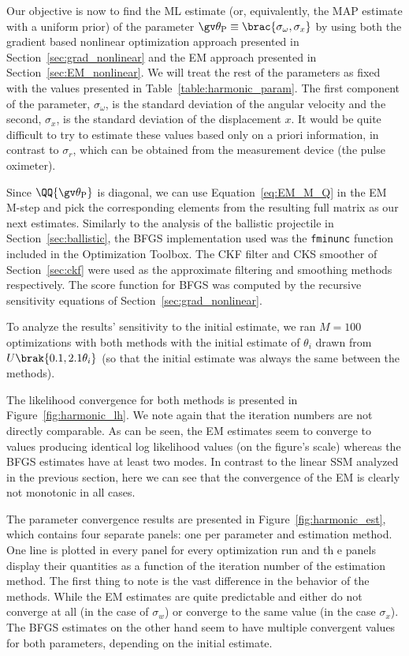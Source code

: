 Our objective is now to find the ML estimate (or, equivalently, the MAP estimate with a uniform prior)
of the parameter $\Th_{\textrm{P}}\equiv \brac{\sigma_\omega,\sigma_x}$ by using both the
gradient based nonlinear optimization approach presented in Section~\ref{sec:grad_nonlinear} and the EM
approach presented in Section~\ref{sec:EM_nonlinear}. We will treat
the rest of the parameters as fixed with the values 
presented in Table~\ref{table:harmonic_param}.
The first component of the parameter, $\sigma_\omega$, is the standard deviation
of the angular velocity and the second, $\sigma_x$, is the standard deviation
of the displacement $x$. It would be quite difficult to try to estimate
these values based only on a priori information, in contrast to $\sigma_r$,
which can be obtained from the measurement device (the pulse oximeter).

Since $\QQ{\Th_{\textrm{P}}}$ is diagonal, we can use Equation~\eqref{eq:EM_M_Q}
in the EM M-step and pick the corresponding elements from the resulting full matrix
as our next estimates. Similarly to the analysis of the ballistic projectile in Section~\ref{sec:ballistic}, 
the BFGS implementation used was the \texttt{fminunc} function included in the 
\matlab{} Optimization Toolbox. The CKF filter and CKS smoother of Section~\ref{sec:ckf} were used
as the approximate filtering and smoothing methods respectively. The score function
for BFGS was computed by the recursive sensitivity equations of Section~\ref{sec:grad_nonlinear}.  

To analyze the results' sensitivity to the initial estimate, we ran $M=100$ optimizations
with both methods with the initial estimate of $\theta_i$ drawn from 
$U\brak{0.1,2.1\theta_i}$ (so that the initial estimate was always the same between the methods). 


The likelihood convergence for
both methods is presented in Figure~\ref{fig:harmonic_lh}.
We note again that the iteration numbers are
not directly comparable. As can be seen, the EM estimates seem to
converge to values producing identical log likelihood values (on the figure's scale) whereas
the BFGS estimates have at least two modes. In contrast to the linear SSM
analyzed in the previous section, here we can see that the convergence of the EM
is clearly not monotonic in all cases.

The parameter convergence
results are presented in Figure~\ref{fig:harmonic_est},
which contains four separate panels: one per parameter and estimation method. 
One line is plotted in every panel for every optimization run and th
e panels display their quantities
as a function of the iteration number of the estimation method.
The first thing to note is the vast difference in the behavior of the methods.
While the EM estimates are quite predictable and either do not converge at
all (in the case of $\sigma_w$) or converge to the same value (in the case $\sigma_x$).
The BFGS estimates on the other hand seem to have multiple convergent values for both
parameters, depending on the initial estimate.

